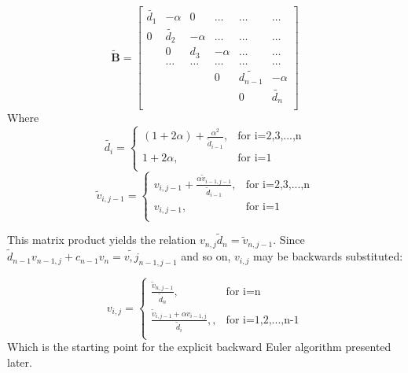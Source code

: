 \documentclass[%
oneside,                 %
final,                   %
10pt]{article}
\begin{document}
\[
    \mathbf{\tilde{B}} = \begin{bmatrix}
                      \tilde{d_1}& -\alpha & 0 &\dots   & \dots &\dots  \\
                           0 & \tilde{d_2} & -\alpha &\dots &\dots &\dots \\
                           & 0 & d_3 & -\alpha & \dots & \dots     \\
                           & \dots   & \dots &\dots   &\dots  &\dots  \\
                           &   &  &0  &\tilde{d_{n-1}}& -\alpha  \\
                           &    &  &   &0 & \tilde{d_n}  \\
                      \end{bmatrix}
                      \label{finalmatrixproduct}
\]
Where \begin{equation}
\tilde{d_i} =
  \begin{cases}
                                  (1+2 \alpha)+\frac{\alpha^2}{\tilde{d}_{i-1}},  & \text{for i=2,3,...,n}\\
                                   1+2 \alpha ,  & \text{for i=1} \\

  \end{cases}
\label{eq:tilded_i}
\end{equation}
\begin{equation}
\tilde{v}_{i,j-1}=
  \begin{cases}
                                  v_{i,j-1}+\frac{\alpha \tilde{v}_{i-1,j-1} }{\tilde{d}_{i-1}}, & \text{for i=2,3,...,n}\\
                                   v_{i,j-1} ,  & \text{for i=1} \\

  \end{cases}
\label{eq:b_i}
\end{equation}

This matrix product yields the relation $v_{n,j} \tilde{d}_n=\tilde{v}_{n,j-1}$. Since $\tilde{d}_{n-1} v_{n-1,j} + c_{n-1} v_n = \tilde{v,j}_{n-1,j-1}$ and so on, $v_{i,j}$ may be backwards substituted:\par 

\begin{equation}
   v_{i,j} =
  \begin{cases}
                                  \frac{\tilde{v}_{n,j-1}}{\tilde{d}_n} ,  & \text{for i=n}\\
                \frac{\tilde{v}_{i,j-1}+\alpha v_{i-1,j}}{\tilde{d}_i}, , & \text{for i=1,2,...,n-1}                    \\

  \end{cases}
\label{eq:v_i}
\end{equation}
Which is the starting point for the explicit backward Euler algorithm presented later. 
\end{document}
